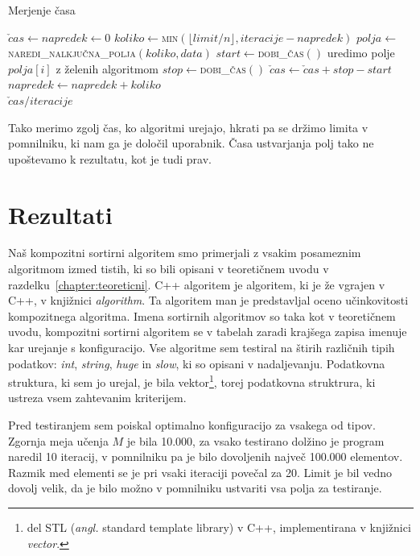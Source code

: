 \documentclass[a4paper,oneside,12pt]{article}
\begin{document}
\begin{algorithm}[h!t!]
  \caption{Merjenje časa}\label{algo:time}
  \begin{algorithmic}[1]
    \State \label{line:init} $\check{c}as \gets napredek \gets 0$
    \Repeat \label{line:repeattimestart}
      \State \label{line:koliko} $koliko \gets $\textsc{min}$(\lfloor limit / n \rfloor, iteracije - napredek)$
      \State \label{line:polja} $polja \gets $\textsc{naredi\_nalkjučna\_polja}$(koliko, data)$
      \State \label{line:getstarttime} $start \gets $\textsc{dobi\_čas}$()$
       \label{line:beginsortfor}
        \State uredimo polje $polja[i]$ z želenih algoritmom
      \EndFor \label{line:endsortfor}
      \State \label{line:getendtime} $stop \gets $\textsc{dobi\_čas}$()$
      \State $\check{c}as \gets \check{c}as + stop - start$
      \State $napredek \gets napredek + koliko$
     \label{line:repeattimeend} \\
    \Return \label{line:returnaverage}$\check{c}as / iteracije$
  \end{algorithmic}
\end{algorithm}
Tako merimo zgolj čas, ko algoritmi urejajo, hkrati pa se držimo limita v pomnilniku, ki
nam ga je določil uporabnik. Časa ustvarjanja polj tako ne upoštevamo k rezultatu, kot
je tudi prav.


\section{Rezultati}
Naš kompozitni sortirni algoritem smo primerjali z vsakim posameznim algoritmom izmed
tistih, ki so bili opisani v teoretičnem uvodu v razdelku~\ref{chapter:teoreticni}. C++ algoritem
je algoritem, ki je že vgrajen v C++, v knjižnici \emph{algorithm}. Ta algoritem
man je predstavljal oceno učinkovitosti kompozitnega algoritma.
Imena sortirnih algoritmov so taka kot v teoretičnem uvodu, kompozitni sortirni algoritem se v tabelah 
zaradi krajšega zapisa imenuje kar urejanje s konfiguracijo.
Vse algoritme sem testiral na štirih različnih tipih podatkov: 
\emph{int}, \emph{string}, \emph{huge} in \emph{slow}, ki so opisani v nadaljevanju.
Podatkovna struktura, ki sem jo urejal, je bila vektor\footnote{del STL
(\emph{angl.} standard template library) v C++,
implementirana v knjižnici \emph{vector}.}, torej podatkovna struktrura, ki
ustreza vsem zahtevanim kriterijem.

Pred testiranjem sem poiskal optimalno konfiguracijo za vsakega od tipov. Zgornja meja
učenja $M$ je bila 10.000, za vsako testirano dolžino je program naredil 10 iteracij, v pomnilniku
pa je bilo dovoljenih največ 100.000 elementov. Razmik med elementi se je pri vsaki iteraciji povečal za 20.
Limit je bil vedno dovolj velik, da je bilo možno v pomnilniku ustvariti vsa polja za testiranje.
\end{document}
